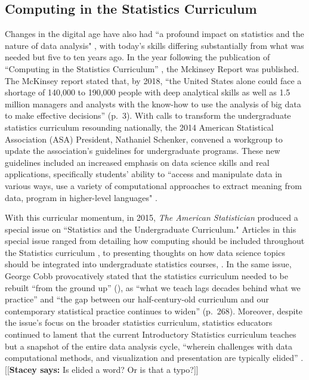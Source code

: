 \documentclass[12pt]{article}
\newcommand{\stacey}[1]{{\color{purple}[[\textbf{Stacey says: }#1]]}}
\begin{document}
\subsection{Computing in the Statistics Curriculum}

\quad Changes in the digital age have also had ``a profound impact on statistics
and the nature of data analysis" \citep[p.\ 97]{nolan}, with today's skills 
differing substantially from what was needed but five to ten years ago. 
In the year following the publication of ``Computing in the Statistics 
Curriculum'' \citep{nolan}, the Mckinsey Report \citep{mckinsey} was published. 
The McKinsey report stated that, by 2018, ``the United States alone could face a
shortage of 140,000 to 190,000 people with deep analytical skills as well as 1.5
million managers and analysts with the know-how to use the analysis of big data
to make effective decisions'' (p.\ 3). With calls to transform the undergraduate
statistics curriculum resounding nationally, the 2014 American Statistical 
Association (ASA) President, Nathaniel Schenker, convened a workgroup to update
the association's guidelines for undergraduate programs. These new guidelines 
included an increased emphasis on data science skills and real applications, 
specifically students' ability to ``access and manipulate data in various ways,
use a variety of computational approaches to extract meaning from data, program
in higher-level languages" \citep[p.\ 7]{asa}. 

\quad With this curricular momentum, in 2015, \emph{The American Statistician} 
produced a special issue on ``Statistics and the Undergraduate Curriculum." Articles 
in this special issue ranged from detailing how computing should be included 
throughout the Statistics curriculum \citep{jenny, tintle, hesterberg}, to 
presenting thoughts on how data science topics should be integrated into 
undergraduate statistics courses, \citep{esr, grimshaw, 
baumer_datascience, hardin}. In the same issue, George Cobb provocatively stated
that the statistics curriculum needed to be rebuilt ``from the ground up'' 
(\citeyear{cobb}), as ``what we teach lags decades behind what we practice'' and
``the gap between our half-century-old curriculum and our contemporary 
statistical practice continues to widen'' (p.\ 268). Moreover, despite the 
issue's focus on the broader statistics curriculum, statistics educators
continued to lament that the current Introductory Statistics curriculum teaches
but a snapshot of the entire data analysis cycle, ``wherein challenges with data
computational methods, and visualization and presentation are typically elided'' 
\citep[p.\ 336]{baumer_datascience}. \stacey{Is elided a word? Or is that a typo?}
\end{document}
